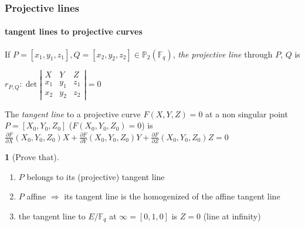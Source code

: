 \documentclass[10pt]{beamer} %
\newcommand{\F}{\mathbb F}
\theoremstyle{definition}
\newtheorem{exercise}[theorem]{\translate{Exercise}}
\begin{document}
\begin{frame}
\frametitle{Projective lines}
\framesubtitle{tangent lines to projective curves}

\begin{Definition}
If $P=[x_1,y_1,z_1], Q=[x_2,y_2,z_2]\in\mathbb P_2(\F_q)$, \emph{the projective
line} through $P$, $Q$ is\\
\centerline{$r_{P,Q}: \det\left|\begin{matrix}
                      X & Y & Z \\ x_1&y_1&z_1\\ x_2&y_2&z_2
                     \end{matrix}\right|=0$}
\end{Definition}\pause

\begin{Definition}
The \emph{tangent line} to a projective curve $F(X,Y,Z)=0$ at a non singular point $P=[X_0,Y_0,Z_0]$
($F(X_0,Y_0,Z_0)=0$) is
\scriptsize{{\color[cmyk]{1,0,1,0.5}$\frac{\partial F}{\partial X}(X_0,Y_0,Z_0)X+\frac{\partial F}{\partial Y}(X_0,Y_0,Z_0)Y+
\frac{\partial F}{\partial Z}(X_0,Y_0,Z_0)Z=0$}}
\end{Definition}\pause

\begin{exercise}[Prove that]
\begin{enumerate}[<+-| alert@+>]
 \item $P$ belongs to its (projective) tangent line
 \item $P$ affine $\Rightarrow$ its tangent line is the homogenized of the affine tangent line
 \item the tangent line to $E/\F_q$ at $\infty=[0,1,0]$ is $Z=0$ (line at infinity)\vspace*{-5.2pt}
\end{enumerate}
\end{exercise}
\end{frame}
\end{document}
